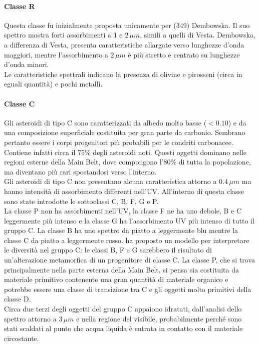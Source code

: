 \documentclass[a4paper,11pt,openright]{book}
\begin{document}
\paragraph*{Classe R}
Questa classe fu inizialmente proposta unicamente per (349) Dembowska. Il suo spettro mostra forti assorbimenti a $1$ e $2\,\mu m$, simili a quelli di Vesta. Dembowska, a differenza di Vesta, presenta caratteristiche allargate verso lunghezze d'onda maggiori, mentre l'assorbimento a $2\,\mu m$ è più stretto e centrato su lunghezze d'onda minori.\\
Le caratteristiche spettrali indicano la presenza di olivine e pirosseni (circa in eguali quantità) e pochi metalli. 

\paragraph*{Classe C}
Gli asteroidi di tipo C sono caratterizzati da albedo molto basse ($<0.10$) e da una composizione superficiale costituita per gran parte da carbonio. Sembrano pertanto essere i corpi progenitori più probabili per le condriti carbonacee. Contiene infatti circa il 75\% degli asteroidi noti. Questi oggetti dominano nelle regioni esterne della Main Belt, dove compongono l'80\% di tutta la popolazione, ma diventano più rari spostandosi verso l'interno.\\
Gli asteroidi di tipo C non presentano alcuna caratteristica attorno a $0.4\,\mu m$ ma hanno intensità di assorbimento differenti nell'UV. All'interno di questa classe sono state introdotte le sottoclassi C, B, F, G e P.\\
La classe P non ha assorbimenti nell'UV, la classe F ne ha uno debole, B e C leggermente più intenso e la classe G ha l'assorbimento UV più intenso di tutto il gruppo C. La classe B ha uno spettro da piatto a leggermente blu mentre la classe C da piatto a leggermente rosso. \citet{bell_asteroids_1989} ha proposto un modello per interpretare le diversità nel gruppo C: le classi B, F e G sarebbero il risultato di un'alterazione metamorfica di un progenitore di classe C. La classe P, che si trova principalmente nella parte esterna della Main Belt, si pensa sia costituita da materiale primitivo contenente una gran quantità di materiale organico e potrebbe essere una classe di transizione tra C e gli oggetti molto primitivi della classe D.\\
Circa due terzi degli oggetti del gruppo C appaiono idratati, dall'analisi dello spettro attorno a $3\,\mu m$ e nella regione del visibile, probabilmente perché sono stati scaldati al punto che acqua liquida è entrata in contatto con il materiale circostante.
\end{document}
